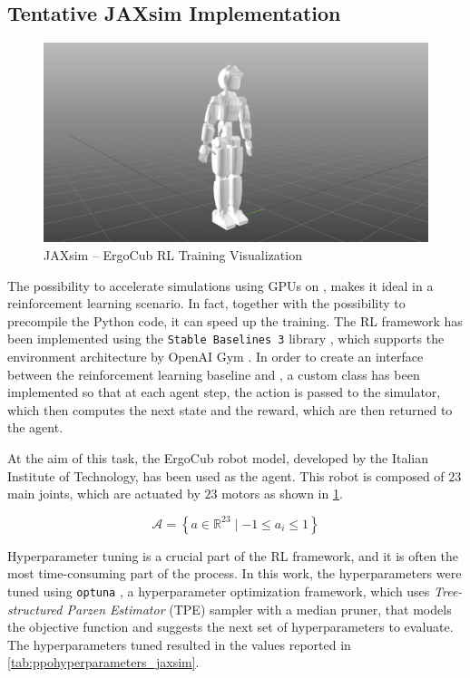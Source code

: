 \subsection{Tentative JAXsim Implementation}

\begin{figure}
    \centering
    \caption{JAXsim -- ErgoCub RL Training Visualization}
    \label{fig:ergocubtraining}
    \includegraphics[width=.9\textwidth]{Images/ergocub_training.png}
\end{figure}

The possibility to accelerate simulations using \ac{GPU}s on \jaxsim, makes it ideal in a reinforcement learning scenario. In fact, together with the possibility to precompile the Python code, it can speed up the training. The \ac{RL} framework has been implemented using the \texttt{Stable Baselines 3} library \citep{raffin_stable-baselines3_2021}, which supports the environment architecture by OpenAI Gym \citep{brockman_openai_2016}. In order to create an interface between the reinforcement learning baseline and \jaxsim, a custom class has been implemented so that at each agent step, the action is passed to the simulator, which then computes the next state and the reward, which are then returned to the agent.

At the aim of this task, the ErgoCub robot model, developed by the Italian Institute of Technology, has been used as the agent. This robot is composed of $23$ main joints, which are actuated by $23$ motors as shown in \cref{fig:ergocubtraining}.

\begin{equation}
    \label{eqn:ergocub_action_space}
    \mathcal{A} = \left\{ a \in \mathbb{R} ^{23} \mid -1 \leq a_i \leq 1 \right\}
\end{equation}

Hyperparameter tuning is a crucial part of the \ac{RL} framework, and it is often the most time-consuming part of the process. In this work, the hyperparameters were tuned using \texttt{optuna} \citep{akiba_optuna_2019}, a hyperparameter optimization framework, which uses \textit{Tree-structured Parzen Estimator} (\ac{TPE}) sampler with a median pruner, that models the objective function and suggests the next set of hyperparameters to evaluate. The hyperparameters tuned resulted in the values reported in \cref{tab:ppohyperparameters_jaxsim}.


